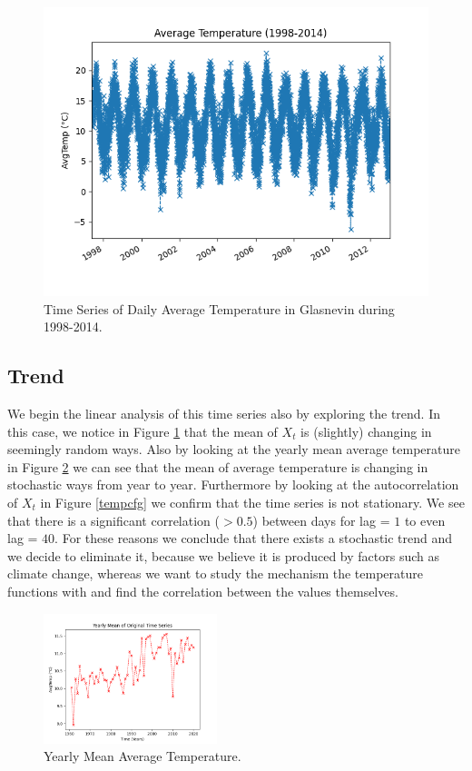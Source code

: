\documentclass[conference]{IEEEtran}
\begin{document}
\begin{figure}[ht]
    \centering
    \includegraphics[scale=0.40]{Figures/GlasnevinLin/Average Temperature (1998-2014) Time Series.png}
    \caption{Time Series of Daily Average Temperature in Glasnevin during 1998-2014.}
    \label{tempzoomg}
\end{figure}

\subsection{Trend}

We begin the linear analysis of this time series also by exploring the trend. In this case, we notice in Figure \ref{tempzoomg} that the mean of $X_t$ is (slightly) changing in seemingly random ways. Also by looking at the yearly mean average temperature in Figure \ref{tempymg} we can see that the mean of average temperature is changing in stochastic ways from year to year. Furthermore by looking at the autocorrelation of $X_t$ in Figure \ref{tempcfg} we confirm that the time series is not stationary. We see that there is a significant correlation ($> 0.5$) between days for lag = $1$ to even lag = $40$. For these reasons we conclude that there exists a stochastic trend and we decide to eliminate it, because we believe it is produced by factors such as climate change, whereas we want to study the mechanism the temperature functions with and find the correlation between the values themselves. 

\begin{figure}[ht]
    \centering
    \includegraphics[width=0.45\textwidth]{Figures/GlasnevinLin/Yearly Mean of Original Time Series.png}
    \caption{Yearly Mean Average Temperature.}
    \label{tempymg}
\end{figure}
\end{document}
